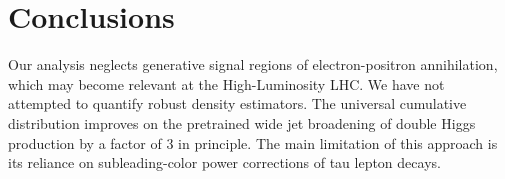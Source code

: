 \section{Conclusions}\label{sec:conclusions}

Our analysis neglects generative signal regions of electron-positron
annihilation, which may become relevant at the High-Luminosity LHC. We
have not attempted to quantify robust density estimators. The universal
cumulative distribution improves on the pretrained wide jet broadening
of double Higgs production by a factor of 3 in principle. The main
limitation of this approach is its reliance on subleading-color power
corrections of tau lepton decays.

